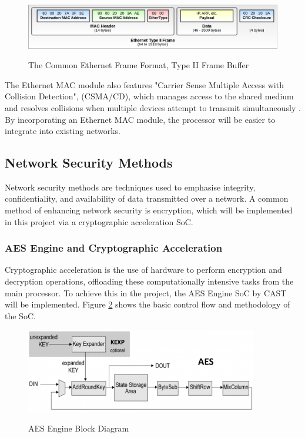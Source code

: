 \begin{figure}[h]
    \begin{center}
    \caption{The Common Ethernet Frame Format, Type II Frame Buffer \cite{Wikipedia_2024}}
    \includegraphics[width=1.0\textwidth]{./Figures/Ethernet_Type_II_Frame_format.png}
    \label{Fig:4}
    \end{center}
\end{figure}

The Ethernet MAC module also features "Carrier Sense Multiple Access with Collision Detection", (CSMA/CD), which manages access to the shared medium and resolves collisions when multiple devices attempt to transmit simultaneously \cite{KuroseRoss2021}. By incorporating an Ethernet MAC module, the processor will be easier to integrate into existing networks.

\subsection{Network Security Methods}
\label{subsection:Network Security Methods}
Network security methods are techniques used to emphasise integrity, confidentiality, and availability of data transmitted over a network. A common method of enhancing network security is encryption, which will be implemented in this project via a  cryptographic acceleration SoC.

\subsubsection{AES Engine and Cryptographic Acceleration}
Cryptographic acceleration is the use of hardware to perform encryption and decryption operations, offloading these computationally intensive tasks from the main processor. To achieve this in the project, the AES Engine SoC by CAST will be implemented. Figure \ref{Fig:5} shows the basic control flow and methodology of the SoC.

\begin{figure}[h]
    \begin{center}
    \caption{AES Engine Block Diagram \cite{CASTInc2024}}
    \includegraphics[width=0.9\textwidth]{./Figures/aes-block_0.png}
    \label{Fig:5}
    \end{center}
\end{figure}

